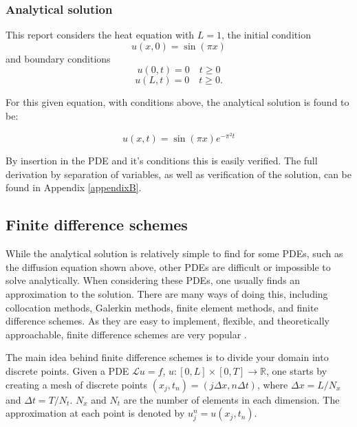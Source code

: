\subsubsection{Analytical solution}\label{sec:anal_sol}
This report considers the heat equation with $L=1$, the initial condition
\begin{equation}
u(x, 0) = \sin(\pi x)    
\end{equation}
and boundary conditions
\begin{equation}
    u(0, t)=0 \quad t\ge0
\end{equation}
\begin{equation}
    u(L, t)=0 \quad t\ge 0.
\end{equation}

For this given equation, with conditions above, the analytical solution is found to be: 

\begin{equation}\label{analytical_sol}
    u(x,t) = \sin(\pi x) e^{-\pi^2 t}
\end{equation}

By insertion in the PDE and it's conditions this is easily verified. The full derivation by separation of variables, as well as verification of the solution, can be found in Appendix \ref{appendixB}.

\subsection{Finite difference schemes}\label{sec:FD}
While the analytical solution is relatively simple to find for some PDEs, such as the diffusion equation shown above, other PDEs are difficult or impossible to solve analytically.
When considering these PDEs, one usually finds an approximation to the solution.
There are many ways of doing this, including collocation methods, Galerkin methods, finite element methods, and finite difference schemes.
As they are easy to implement, flexible, and theoretically approachable, finite difference schemes are very popular \citep[p. 119]{tveitoPDE}.

The main idea behind finite difference schemes is to divide your domain into discrete points.
Given a PDE $\mathcal{L}u=f$, $u : [0, L] \times [0, T] \to \mathbb{R}$, one starts by creating a mesh of discrete points $(x_j, t_n) = (j \Delta x, n\Delta t)$, where $\Delta x = L/N_x$ and $\Delta t = T/N_t$.
$N_x$ and $N_t$ are the number of elements in each dimension.
The approximation at each point is denoted by $u_j^n = u(x_j, t_n)$.

